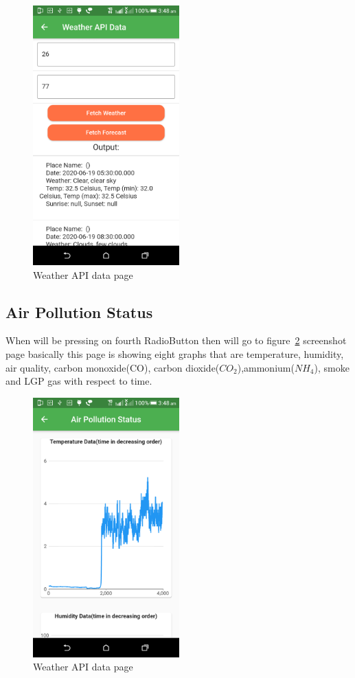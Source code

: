 \begin{figure}[!ht]
\centering
\includegraphics[height=10cm]{figures/weather-data.png}
\caption{\label{img417} Weather API data page}
\end{figure}

\subsection{Air Pollution Status}
When will be pressing on fourth RadioButton then will go to figure~\ref{img418} screenshot page basically this page is showing eight graphs that are temperature, humidity, air quality, carbon monoxide(CO), carbon dioxide($CO_{2}$),ammonium($NH_{4}$), smoke and LGP gas with respect to time.

\begin{figure}[!ht]
\centering
\includegraphics[height=10cm]{figures/pollution-status.png}
\caption{\label{img418} Weather API data page}
\end{figure}









